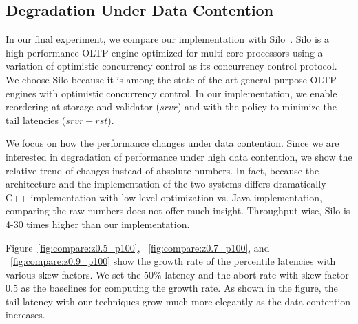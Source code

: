 \subsection{Degradation Under Data Contention}
\label{subsec:experiment:compare}

In our final experiment, we compare our implementation with Silo~\cite{tu2013speedy}. Silo is a high-performance OLTP engine optimized for multi-core processors using a variation of optimistic concurrency control as its concurrency control protocol. We choose Silo because it is among the state-of-the-art general purpose OLTP engines with optimistic concurrency control. In our implementation, we enable reordering at storage and validator ($srvr$) and with the policy to minimize the tail latencies ($srvr-rst$).

We focus on how the performance changes under data contention. Since we are interested in degradation of performance under high data contention, we show the relative trend of changes instead of absolute numbers. In fact, because the architecture and the implementation of the two systems differs dramatically -- C++ implementation with low-level optimization vs. Java implementation, comparing the raw numbers does not offer much insight. Throughput-wise, Silo is 4-30 times higher than our implementation.

Figure~\ref{fig:compare:z0.5_p100}, ~\ref{fig:compare:z0.7_p100}, and ~\ref{fig:compare:z0.9_p100} show the growth rate of the percentile latencies with various skew factors. We set the 50\% latency  and the abort rate with skew factor 0.5 as the baselines for computing the growth rate. As shown in the figure, the tail latency with our techniques grow much more elegantly as the data contention increases.
